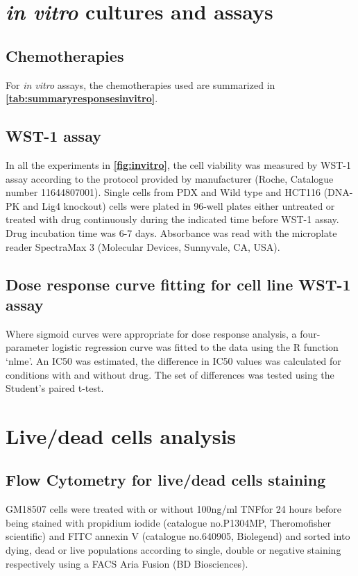\section{\textit{in vitro} cultures and assays}

\subsection{Chemotherapies}
For \textit{in vitro} assays, the chemotherapies used are summarized in \textbf{\autoref{tab:summaryresponsesinvitro}}.


\subsection{WST-1 assay}
In all the experiments in \textbf{\autoref{fig:invitro}}, the cell viability was measured by WST-1 assay according to the protocol provided by manufacturer (Roche, Catalogue number 11644807001). Single cells from PDX and Wild type and HCT116 (DNA-PK and Lig4 knockout) cells were plated in 96-well plates either untreated or treated with drug continuously during the indicated time before WST-1 assay. Drug incubation time was 6-7 days. Absorbance was read with the microplate reader SpectraMax 3 (Molecular Devices, Sunnyvale, CA, USA).

\subsection{Dose response curve fitting for cell line WST-1 assay}
Where sigmoid curves were appropriate for dose response analysis, a four-parameter logistic regression curve was fitted to the data using the R function ‘nlme’. An IC50 was estimated, the difference in IC50 values was calculated for conditions with and without drug. The set of differences was tested using the Student's paired t-test.

\section{Live/dead cells analysis}

\subsection{Flow Cytometry for live/dead cells staining}
 GM18507 cells were treated with or without 100ng/ml TNF\textalpha for 24 hours before being stained with propidium iodide (catalogue no.P1304MP, Theromofisher scientific) and FITC annexin V (catalogue no.640905, Biolegend) and sorted into dying, dead or live populations according to single, double or negative staining respectively using a FACS Aria Fusion (BD Biosciences).
 
